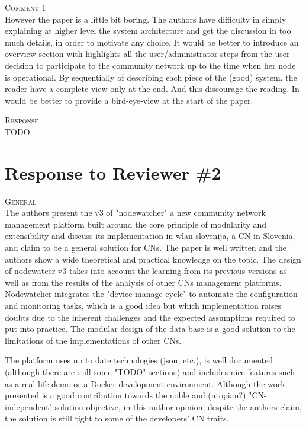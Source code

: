 \documentclass[12pt,twoside,a4paper]{report}
\begin{document}
\vspace{0.5cm}\noindent\textsc{Comment 1}\\
However the paper is a little bit boring. The authors  have difficulty in simply explaining at higher level the system architecture and get the discussion in too much details, in order to motivate any choice. It would be better to introduce an overview section with highlights all the user/administrator steps from the user decision to participate to the community network up to the time when her node is operational. By sequentially of describing each piece of the (good) system, the reader have a complete view only at the end. And this discourage the reading. In would be better to provide a bird-eye-view at the start of the paper. 

\vspace{0.2cm}\noindent\textsc{Response}\\
TODO

\newpage

\section*{Response to Reviewer \#2}

\vspace{0.5cm}\noindent\textsc{General}\\
The authors present the v3 of "nodewatcher" a new community network management platform built around the core principle of modularity and extensibility and discuss its implementation in wlan slovenija, a CN in Slovenia, and claim to be a general solution for CNs. The paper is well written and the authors show a wide theoretical and practical knowledge on the topic. The design of nodewatcer v3 takes into account the learning from its previous versions as well as from the results of the analysis of other CNs management platforms. Nodewatcher integrates the "device manage cycle" to automate the configuration and monitoring tasks, which is a good idea but which implementation raises doubts due to the inherent challenges and the expected assumptions required to put into practice. The modular design of the data base is a good solution to the limitations of the implementations of other CNs.

The platform uses up to date technologies (json, etc.), is well documented (although there are still some "TODO" sections) and includes nice features such as a real-life demo or a Docker development environment. Although the work presented is a good contribution towards the noble and (utopian?) "CN-independent" solution objective, in this author opinion, despite the authors claim, the solution is still tight to some of the developers' CN traits.
\end{document}
